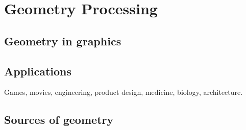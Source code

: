 \chapter{Geometry Processing}
\section{Geometry in graphics}
\section{Applications}
Games, movies, engineering, product design, medicine, biology, architecture.
\section{Sources of geometry}
